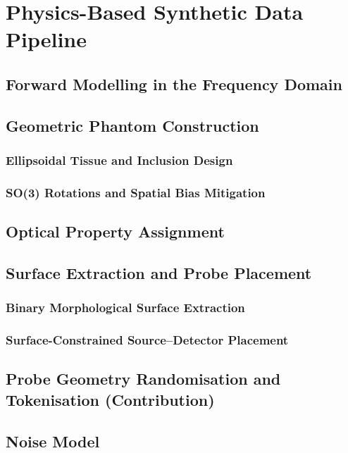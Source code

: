 \chapter{Physics-Based Synthetic Data Pipeline}
\section{Forward Modelling in the Frequency Domain}
\section{Geometric Phantom Construction}
\subsection{Ellipsoidal Tissue and Inclusion Design}
\subsection{SO(3) Rotations and Spatial Bias Mitigation}
\section{Optical Property Assignment}
\section{Surface Extraction and Probe Placement}
\subsection{Binary Morphological Surface Extraction}
\subsection{Surface-Constrained Source–Detector Placement}
\section{Probe Geometry Randomisation and Tokenisation (Contribution)}
\section{Noise Model}
